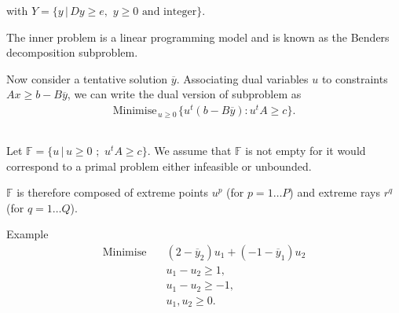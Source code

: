with $Y = \{ y \, |\, Dy \geq e, \,\, y \geq 0
\textrm{ and integer} \}$.
\vspace{1cm}


The inner problem is a linear programming model and is known as the Benders decomposition subproblem.

\vfill

Now consider a tentative solution $\overline{y}$. Associating dual variables $u$ to constraints $Ax \geq
b-B\overline{y}$, we can write the dual version of  subproblem as
\begin{eqnarray*}
\label{bd3}  \textrm{Minimise}_{\, u\geq 0 \,} \{ u^t(b-B\overline{y}) :
u^tA \geq c\}.
\end{eqnarray*}

\vfill


\newpage

\subsection*{}

Let  $\mathbb{F} = \{ u \, |\, u \geq 0 \,\, ; \, \, u^tA \geq c \}$.  We assume that $\mathbb{F}$ is not empty for it would correspond to a primal problem either infeasible or
unbounded. 

$\mathbb{F}$ is therefore composed of extreme points $u^p$ (for
$p=1 \dots P$) and extreme rays $r^q$ (for $q=1 \dots Q$).\\


\begin{bclogo}[logo=\bccrayon]{\small Example }
\small \vspace{-.5cm}
\begin{align*}
\textrm{Minimise} \quad &  (2-\overline{y}_2)u_1 + (-1 - \overline{y}_1)u_2 \\
& u_1 -  u_2  \geq 1, \\
& u_1 -u_2 \geq -1, \\
& u_1, u_2 \geq 0.
\end{align*}

\end{bclogo}




\begin{center}
\end{center}


